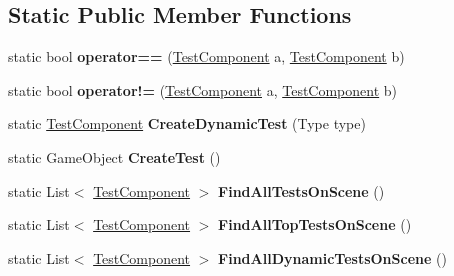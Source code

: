 \subsection*{Static Public Member Functions}
\begin{DoxyCompactItemize}
\item 
\mbox{\label{class_unity_test_1_1_test_component_adc7b207d92ade7639da36e4b6024bec0}} 
static bool {\bfseries operator==} (\hyperlink{class_unity_test_1_1_test_component}{Test\+Component} a, \hyperlink{class_unity_test_1_1_test_component}{Test\+Component} b)
\item 
\mbox{\label{class_unity_test_1_1_test_component_aa7fafabb9c48198c9c593a5a283df007}} 
static bool {\bfseries operator!=} (\hyperlink{class_unity_test_1_1_test_component}{Test\+Component} a, \hyperlink{class_unity_test_1_1_test_component}{Test\+Component} b)
\item 
\mbox{\label{class_unity_test_1_1_test_component_ab1913ba8bf7fd7b0522a6b2a5e7ba12d}} 
static \hyperlink{class_unity_test_1_1_test_component}{Test\+Component} {\bfseries Create\+Dynamic\+Test} (Type type)
\item 
\mbox{\label{class_unity_test_1_1_test_component_a8c7f7ac0a73d4ae4e9925a6c427860dd}} 
static Game\+Object {\bfseries Create\+Test} ()
\item 
\mbox{\label{class_unity_test_1_1_test_component_a78a42d05e92bd015a0b66b7f17926508}} 
static List$<$ \hyperlink{class_unity_test_1_1_test_component}{Test\+Component} $>$ {\bfseries Find\+All\+Tests\+On\+Scene} ()
\item 
\mbox{\label{class_unity_test_1_1_test_component_a0556fc9e28c03d5a853019865938245c}} 
static List$<$ \hyperlink{class_unity_test_1_1_test_component}{Test\+Component} $>$ {\bfseries Find\+All\+Top\+Tests\+On\+Scene} ()
\item 
\mbox{\label{class_unity_test_1_1_test_component_a8fcfdc9060aba28fa9377192ec93dcdb}} 
static List$<$ \hyperlink{class_unity_test_1_1_test_component}{Test\+Component} $>$ {\bfseries Find\+All\+Dynamic\+Tests\+On\+Scene} ()

\end{DoxyCompactItemize}
